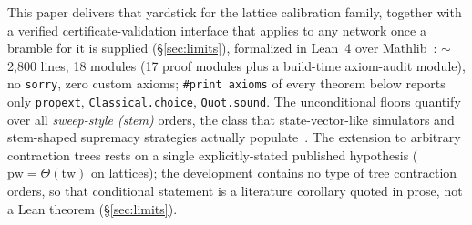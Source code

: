 \documentclass[sigplan,10pt,screen,review,anonymous]{acmart}
\newcommand{\pw}{\mathrm{pw}}
\newcommand{\tw}{\mathrm{tw}}
\begin{document}
This paper delivers that yardstick for the lattice calibration family, together with a
verified certificate-validation interface that applies to any network once a bramble for it
is supplied (\S\ref{sec:limits}), formalized in Lean~4 over
Mathlib~\cite{moura2021lean,mathlib2020}: $\sim$2{,}800 lines, 18 modules (17 proof
modules plus a build-time axiom-audit module), no
\texttt{sorry}, zero custom axioms; \texttt{\#print axioms} of every theorem below
reports only \texttt{propext}, \texttt{Classical.choice}, \texttt{Quot.sound}. The
unconditional floors quantify over all \emph{sweep-style (stem)} orders, the class that
state-vector-like simulators and stem-shaped supremacy strategies actually
populate~\cite{huang2020classical}. The extension to arbitrary contraction trees rests on a
single explicitly-stated published hypothesis ($\pw = \Theta(\tw)$ on lattices); the
development contains no type of tree contraction orders, so that conditional statement is a
literature corollary quoted in prose, not a Lean theorem (\S\ref{sec:limits}).
\end{document}
